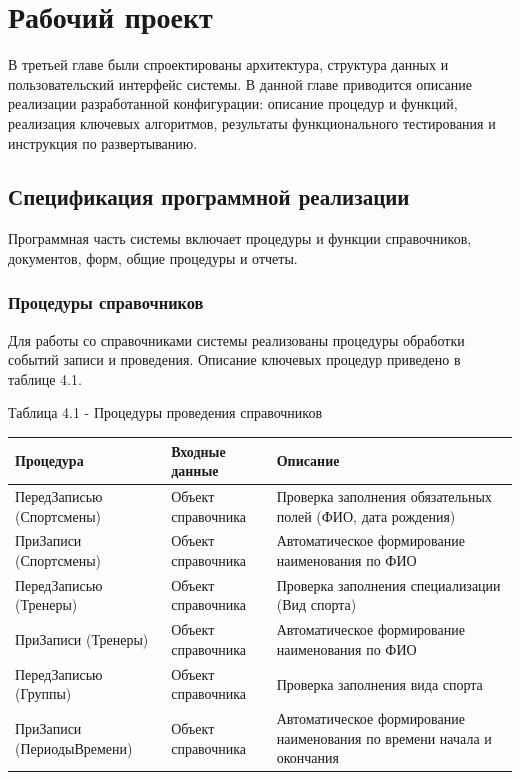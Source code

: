 \section{Рабочий проект}

В третьей главе были спроектированы архитектура, структура данных и пользовательский интерфейс системы. В данной главе приводится описание реализации разработанной конфигурации: описание процедур и функций, реализация ключевых алгоритмов, результаты функционального тестирования и инструкция по развертыванию.

\subsection{Спецификация программной реализации}

Программная часть системы включает процедуры и функции справочников, документов, форм, общие процедуры и отчеты.

\subsubsection{Процедуры справочников}

Для работы со справочниками системы реализованы процедуры обработки событий записи и проведения. Описание ключевых процедур приведено в таблице 4.1.

\vspace{0.5cm}

\newpage
\noindent
Таблица 4.1 - Процедуры проведения справочников

\vspace{0.2cm}
\noindent
\begin{tabular}{|p{5.75cm}|p{4.5cm}|p{5cm}|}
	\hline
	Процедура & Входные данные & Описание \\
	\hline
	ПередЗаписью (Спортсмены) & Объект справочника & Проверка заполнения обязательных полей (ФИО, дата рождения) \\
	\hline
	ПриЗаписи (Спортсмены) & Объект справочника & Автоматическое формирование наименования по ФИО \\
	\hline
	ПередЗаписью (Тренеры) & Объект справочника & Проверка заполнения специализации (Вид спорта) \\
	\hline
	ПриЗаписи (Тренеры) & Объект справочника & Автоматическое формирование наименования по ФИО \\
	\hline
	ПередЗаписью (Группы) & Объект справочника & Проверка заполнения вида спорта \\
	\hline
	ПриЗаписи (ПериодыВремени) & Объект справочника & Автоматическое формирование наименования по времени начала и окончания \\
	\hline
\end{tabular}

